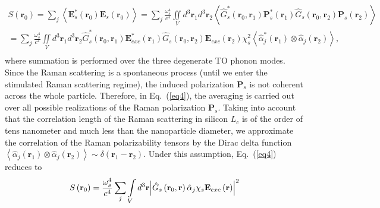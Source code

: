         \begin{align} %
                  S\left( {{{\mathbf{r}}_0}} \right) = \sum\limits_j {\left\langle {{\mathbf{E}}_s^*\left( {{{\mathbf{r}}_0}} \right){{\mathbf{E}}_s}\left( {{{\mathbf{r}}_0}} \right)} \right\rangle }  = \sum\limits_j {\frac{{\omega _s^4}}
                {{{c^4}}}\iint\limits_V {{d^3}{{\mathbf{r}}_1}{d^3}{{\mathbf{r}}_2}\left\langle {\hat G_s^*\left( {{{\mathbf{r}}_0},{{\mathbf{r}}_1}} \right){\mathbf{P}}_s^*\left( {{{\mathbf{r}}_1}} \right){{\hat G}_s}\left( {{{\mathbf{r}}_0},{{\mathbf{r}}_2}} \right){{\mathbf{P}}_s}\left( {{{\mathbf{r}}_2}} \right)} \right\rangle }}  \\
                   = \sum\limits_j {\frac{{\omega _s^4}}
                {{{c^4}}}\iint\limits_V {{d^3}{{\mathbf{r}}_1}{d^3}{{\mathbf{r}}_2}\hat G_s^*\left( {{{\mathbf{r}}_0},{{\mathbf{r}}_1}} \right){\mathbf{E}}_{exc}^*\left( {{{\mathbf{r}}_1}} \right){{\hat G}_s}\left( {{{\mathbf{r}}_0},{{\mathbf{r}}_2}} \right){{\mathbf{E}}_{exc}}\left( {{{\mathbf{r}}_2}} \right)\chi _s^2\left\langle {\hat \alpha _j^*\left( {{{\mathbf{r}}_1}} \right) \otimes {{\hat \alpha }_j}\left( {{{\mathbf{r}}_2}} \right)} \right\rangle }},  \\
            \label{eq4}
        \end{align}
        where summation is performed over the three degenerate TO phonon modes. Since the Raman scattering is a spontaneous process
        (until we enter the stimulated Raman scattering regime), the  induced polarization $\mathbf{P}_s$ is not coherent across
        the whole particle. Therefore, in Eq.~(\ref{eq4}), the averaging is carried out over all possible realizations of the Raman
        polarization $\mathbf{P}_s$. Taking into account that the correlation length of the Raman scattering in silicon $L_c$ is of
        the order of tens nanometer and much less than the nanoparticle diameter, we approximate the correlation of the Raman
        polarizability tensors by the Dirac delta function
        $\left\langle {\hat \alpha_j \left( {{{\mathbf{r}}_1}} \right) \otimes \hat \alpha_j \left( {{{\mathbf{r}}_2}} \right)} \right\rangle \sim \delta \left({{\mathbf{r}_1} - {\mathbf{r}_2}} \right)$.
        Under this assumption, Eq.~(\ref{eq4}) reduces to
        \begin{align}
            S\left( {{{\bf{r}}_0}} \right) = \frac{{\omega _s^4}}{{{c^4}}}\sum\limits_j {\int\limits_V {{d^3}{\bf{r}}{{\left| {{{\hat G}_s}\left(
            {{{\bf{r}}_0},{\bf{r}}} \right){{\hat \alpha }_j}{\chi _s}{{\bf{E}}_{exc}}\left( {\bf{r}} \right)} \right|}^2}} }
            \label{eq5}
        \end{align}
